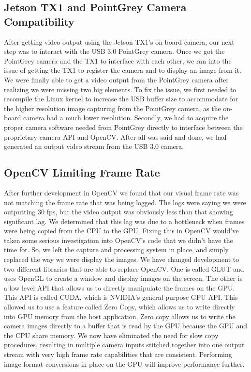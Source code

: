 \documentclass[letterpaper,10pt,titlepage]{IEEEtran}
\begin{document}
   \subsection{Jetson TX1 and PointGrey Camera Compatibility}
   After getting video output using the Jetson TX1's on-board camera, our next step was to interact with the USB 3.0 PointGrey camera. Once we got the PointGrey camera and the TX1 to interface with each other, we ran into the issue of getting the TX1 to register the camera and to display an image from it. We were finally able to get a video output from the PointGrey camera after realizing we were missing two big elements. To fix the issue, we first needed to recompile the Linux kernel to increase the USB buffer size to accommodate for the higher resolution image capturing from the PointGrey camera, as the on-board camera had a much lower resolution. Secondly, we had to acquire the proper camera software needed from PointGrey directly to interface between the proprietary camera API and OpenCV. After all was said and done, we had generated an output video stream from the USB 3.0 camera. 
   
   \subsection{OpenCV Limiting Frame Rate}
   After further development in OpenCV we found that our visual frame rate was not matching the frame rate that was being logged. The logs were saying we were outputting 30 fps, but the video output was obviously less than that showing significant lag. We determined that this lag was due to a bottleneck when frames were being copied from the CPU to the GPU. Fixing this in OpenCV would've taken some serious investigation into OpenCV's code that we didn't have the time for. So, we left the capture and processing system in place, and simply replaced the way we were display the images. We have changed development to two different libraries that are able to replace OpenCV. One is called GLUT and uses OpenGL to create a window and display images on the screen. The other is a low level API that allows us to directly manipulate the frames on the GPU. This API is called CUDA, which is NVIDIA's general purpose GPU API. This allowed us to use a feature called Zero Copy, which allows us to write directly into GPU memory from the host application. Zero copy allows us to write the camera images directly to a buffer that is read by the GPU because the GPU and the CPU share memory. We now have eliminated the need for slow copy procedures, resulting in multiple camera inputs stitched together into one output stream with very high frame rate capabilities that are consistent. Performing image format conversions in-place on the GPU will improve performance further. 
   
\end{document}
